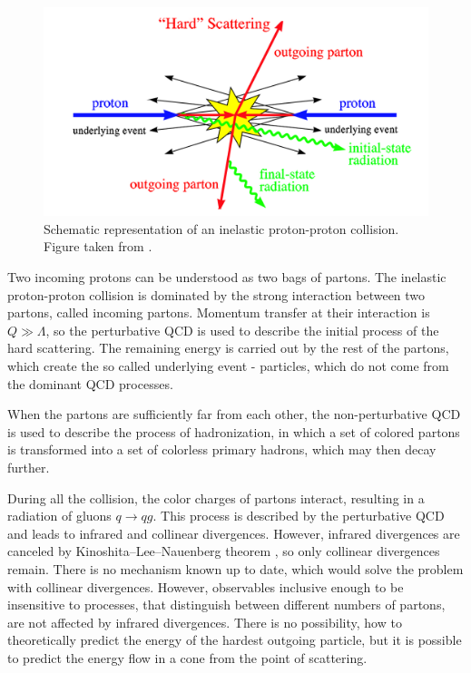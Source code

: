 \begin{figure}[t]
  \centering
  \includegraphics[width=\textwidth]{Chapter2/HardProcess.png}
  \caption[Schematic representation of an inelastic proton-proton
          collision.]
          {Schematic representation of an inelastic proton-proton
          collision. Figure taken from \cite{HardProcess}.}
  \label{fig:HardProcess}
\end{figure}

Two incoming protons can be understood as two bags of partons. 
The inelastic proton-proton collision is dominated by the strong interaction
between two partons, called incoming partons. 
Momentum transfer at their interaction is $Q \gg \Lambda$, so the perturbative
QCD is used to describe the initial process of the hard scattering. 
The remaining energy is carried out by the rest of the partons, which create the so
called underlying event - particles, which do not come from the dominant QCD
processes.

When the partons are sufficiently far from each other, the non-perturbative QCD is
used to describe the process of hadronization, in which a set of colored
partons is transformed into a set of colorless primary hadrons, which may then
decay further. 

During all the collision, the color charges of partons interact, resulting in a
radiation of gluons $q \rightarrow qg$. This process is described by the
perturbative QCD and leads to infrared and collinear divergences. However,
infrared divergences are
canceled by Kinoshita--Lee--Nauenberg theorem \cite{KLN1,KLN2}, so only
collinear divergences remain. There is no mechanism known up to date, which
would solve the problem with collinear divergences. However, observables
inclusive enough to be insensitive to processes, that distinguish between
different numbers of partons, are not affected by infrared divergences.
There is no possibility, how to theoretically predict the energy of the hardest
outgoing particle, but it is possible to predict the energy flow in a cone from
the point of scattering.

